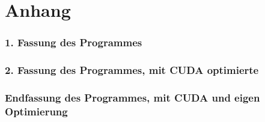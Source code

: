 \section{Anhang}

\subsubsection*{1. Fassung des Programmes}
\bigskip
\subsubsection*{2. Fassung des Programmes, mit CUDA optimierte}
\bigskip
\subsubsection*{Endfassung des Programmes, mit CUDA und eigen Optimierung}
